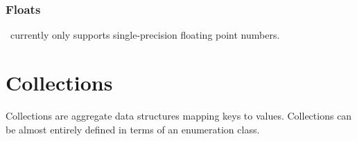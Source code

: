 \documentclass[twoside,twocolumn,9pt]{extarticle}
\begin{document}
\subsubsection{Floats}

\goo\ currently only supports single-precision floating point numbers.

\begin{defs}
\end{defs}

\section{Collections}

Collections are aggregate data structures mapping keys to values.
Collections can be almost entirely defined in terms of an enumeration class.

% 
\end{document}
